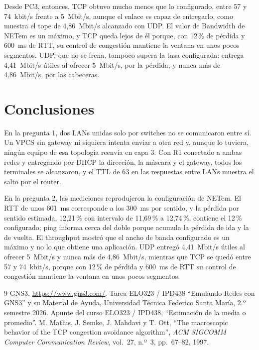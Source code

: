 \documentclass[11pt]{article}
\begin{document}
Desde PC3, entonces, TCP obtuvo mucho menos que lo configurado, entre 57 y 74~kbit/s frente a 5~Mbit/s, aunque el enlace es capaz de entregarlo, como muestra el tope de 4,86~Mbit/s alcanzado con UDP. El valor de Bandwidth de NETem es un máximo, y TCP queda lejos de él porque, con 12\,\% de pérdida y 600~ms de RTT, su control de congestión mantiene la ventana en unos pocos segmentos. UDP, que no se frena, tampoco supera la tasa configurada: entrega 4,41~Mbit/s útiles al ofrecer 5~Mbit/s, por la pérdida, y nunca más de 4,86~Mbit/s, por las cabeceras.

\section{Conclusiones}

En la pregunta 1, dos LANs unidas solo por switches no se comunicaron entre sí. Un VPCS sin gateway ni siquiera intenta enviar a otra red y, aunque lo tuviera, ningún equipo de esa topología reenvía en capa 3. Con R1 conectado a ambas redes y entregando por DHCP la dirección, la máscara y el gateway, todos los terminales se alcanzaron, y el TTL de 63 en las respuestas entre LANs muestra el salto por el router.

En la pregunta 2, las mediciones reprodujeron la configuración de NETem. El RTT de unos 601~ms corresponde a los 300~ms por sentido, y la pérdida por sentido estimada, 12,21\,\% con intervalo de 11,69\,\% a 12,74\,\%, contiene el 12\,\% configurado; ping informa cerca del doble porque acumula la pérdida de ida y la de vuelta. El throughput mostró que el ancho de banda configurado es un máximo y no lo que obtiene una aplicación. UDP entregó 4,41~Mbit/s útiles al ofrecer 5~Mbit/s y nunca más de 4,86~Mbit/s, mientras que TCP se quedó entre 57 y 74~kbit/s, porque con 12\,\% de pérdida y 600~ms de RTT su control de congestión mantiene la ventana en unos pocos segmentos.

\begin{thebibliography}{9}
 GNS3, \url{https://www.gns3.com/}.
 Tarea ELO323 / IPD438 ``Emulando Redes con GNS3'' y su Material de Ayuda, Universidad Técnica Federico Santa María, 2.º semestre 2026.
 Apunte del curso ELO323 / IPD438, ``Estimación de la media o promedio''.
 M. Mathis, J. Semke, J. Mahdavi y T. Ott, ``The macroscopic behavior of the TCP congestion avoidance algorithm'', \textit{ACM SIGCOMM Computer Communication Review}, vol.~27, n.º~3, pp.~67--82, 1997.
\end{thebibliography}
\end{document}
